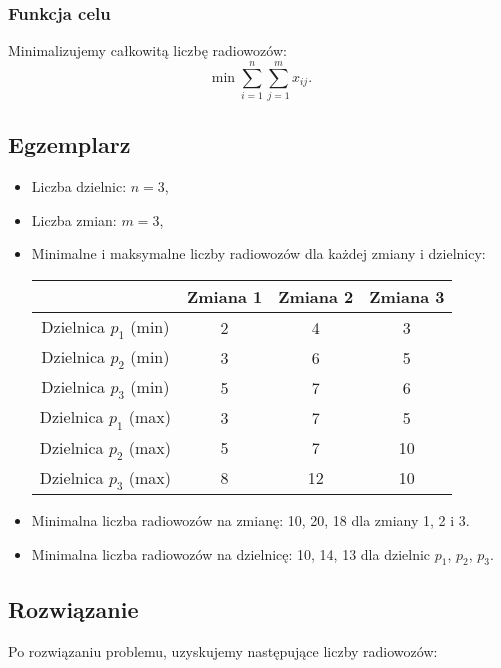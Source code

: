 \documentclass{article}
\begin{document}
\subsubsection{Funkcja celu}
Minimalizujemy całkowitą liczbę radiowozów:
\[
\min \sum_{i=1}^{n} \sum_{j=1}^{m} x_{ij}.
\]

\subsection{Egzemplarz}
\begin{itemize}
    \item Liczba dzielnic: \( n = 3 \),
    \item Liczba zmian: \( m = 3 \),
    \item Minimalne i maksymalne liczby radiowozów dla każdej zmiany i dzielnicy:
        \begin{table}[H]
            \centering
            \begin{tabular}{|c|c|c|c|}
                \hline
                & Zmiana 1 & Zmiana 2 & Zmiana 3 \\
                \hline
                Dzielnica $p_1$ (min) & 2 & 4 & 3 \\
                Dzielnica $p_2$ (min) & 3 & 6 & 5 \\
                Dzielnica $p_3$ (min) & 5 & 7 & 6 \\
                \hline
                Dzielnica $p_1$ (max) & 3 & 7 & 5 \\
                Dzielnica $p_2$ (max) & 5 & 7 & 10 \\
                Dzielnica $p_3$ (max) & 8 & 12 & 10 \\
                \hline
            \end{tabular}
        \end{table}

    \item Minimalna liczba radiowozów na zmianę: 10, 20, 18 dla zmiany 1, 2 i 3.

    \item Minimalna liczba radiowozów na dzielnicę: 10, 14, 13 dla dzielnic $p_1$, $p_2$, $p_3$.
\end{itemize}

\subsection{Rozwiązanie}
Po rozwiązaniu problemu, uzyskujemy następujące liczby radiowozów:
\end{document}

